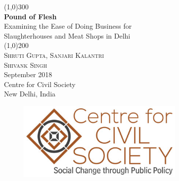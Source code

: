 \documentclass[a4paper, 12pt]{article}
\begin{document}
\begin{titlepage}
\begin{center}
\line(1,0){300}\\
[0.25in]
\huge{\bfseries \textcolor{CCSbrown} {Pound of Flesh }} \\
[0.5cm]
\large {Examining the Ease of Doing Business for \\ Slaughterhouses and Meat Shops in Delhi} \\
\line(1,0){200}\\
[1in]
\textsc{\Large Shruti Gupta, Sanjari Kalantri \\ Shivank Singh} \\
[1.5cm]
{\Large September 2018} \\
[2.0cm]
{\LARGE Centre for Civil Society} \\
[0.1mm]
{\Large New Delhi, India} \\
[2.0cm]
\begin{figure}[H]
\centering
\includegraphics[height = 1.5in]{CCSlogo.jpg}
\end{figure}
\end{center}
\end{titlepage}
\tableofcontents
\newpage
{}
\end{document}
